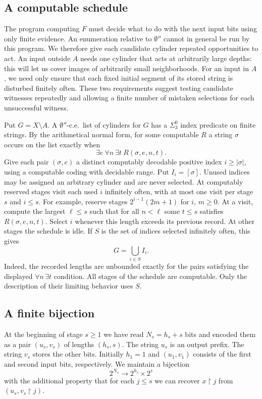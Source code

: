 \documentclass[12pt,reqno]{amsart}
\newcommand{\pre}{\mathbin{\upharpoonright}}
\newcommand{\djump}{\emptyset''}
\begin{document}
\subsection{A computable schedule}
The program computing $F$ must decide what to do with the next input
bits using only finite evidence. An enumeration relative to $\djump$
cannot in general be run by this program. We therefore give each
candidate cylinder repeated opportunities to act. An input outside $A$
needs one cylinder that acts at arbitrarily large depths: this will let
us cover images of arbitrarily small neighborhoods. For an input in $A$,
we need only ensure that each fixed initial segment of its stored string
is disturbed finitely often. These two requirements suggest testing
candidate witnesses repeatedly and allowing a finite number of mistaken
selections for each unsuccessful witness.

Put $G=X\setminus A$. A $\djump$-c.e.\ list of cylinders for $G$ has a
$\Sigma^0_3$ index predicate on finite strings. By the arithmetical normal
form, for some computable $R$ a string $\sigma$ occurs on the list exactly
when
\[
        \exists e\ \forall n\ \exists t\ R(\sigma,e,n,t).
\]
Give each pair $(\sigma,e)$ a distinct computably decodable positive
index $i\ge|\sigma|$, using a computable coding with decidable range. Put
$I_i=[\sigma]$. Unused indices may be assigned an arbitrary cylinder and
are never selected. At computably reserved stages visit each used $i$
infinitely often, with at most one visit per stage $s$ and $i\le s$.
For example, reserve stages $2^{i-1}(2m+1)$ for $i$, $m\ge0$. At a visit,
compute the largest $\ell\le s$ such that for all $n<\ell$ some $t\le s$
satisfies $R(\sigma,e,n,t)$. Select $i$ whenever this length exceeds its
previous record. At other stages the schedule is idle. If $S$ is the set
of indices selected infinitely often, this gives
\begin{equation}\label{eq:schedule}
             G=\bigcup_{i\in S} I_i .
\end{equation}
Indeed, the recorded lengths are unbounded exactly for the pairs satisfying
the displayed $\forall n\,\exists t$ condition. All stages of the schedule
are computable. Only the description of their limiting behavior uses $S$.

\subsection{A finite bijection}
At the beginning of stage $s\ge1$ we have read $N_s=h_s+s$ bits and encoded
them as a pair $(u_s,v_s)$ of lengths $(h_s,s)$. The string $u_s$ is an
output prefix. The string $v_s$ stores the other bits. Initially $h_1=1$
and $(u_1,v_1)$ consists of the first and second input bits, respectively.
We maintain a bijection
\begin{equation}\label{eq:bijection}
   2^{N_s}\longrightarrow 2^{h_s}\times 2^s
\end{equation}
with the additional property that for each $j\le s$ we can recover
$x\pre j$ from $(u_s,v_s\pre j)$.
\end{document}
